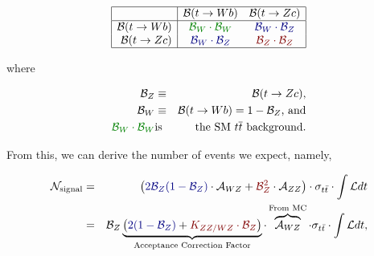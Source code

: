 \begin{displaymath}
\begin{array}{|r|cc|}
\hline
                                & {\mathcal B}(t \rightarrow Wb) &
{\mathcal B}(t \rightarrow Zc) \\
\hline
{\mathcal B}(t \rightarrow Wb) & {\color[rgb]{0, 0.5, 0}\bw \cdot \bw} &
{\color[rgb]{0, 0, 0.5}\bw \cdot \bz} \\
{\mathcal B}(t \rightarrow Zc) & {\color[rgb]{0, 0, 0.5}\bw \cdot \bz} &
{\color[rgb]{0.5, 0, 0}\bz \cdot \bz} \\
\hline
\end{array}
\end{displaymath}

where

\begin{eqnarray*}
\bz & \equiv & {\mathcal B}(t \rightarrow Zc) \textrm{,} \\
\bw & \equiv & {\mathcal B}(t \rightarrow Wb) = 1 - \bz  \textrm{, and} \\
{\color[rgb]{0, 0.5, 0}\bw \cdot \bw} & \textrm{is} & \textrm{the SM \ttbar background.}
\end{eqnarray*}

From this, we can derive the number of events we expect, namely,

\begin{eqnarray*}
{\mathcal N}_\textrm{signal} &=& \left( {\color[rgb]{0, 0, 0.5}2 \bz (1
- \bz)} \cdot {\mathcal A}_{WZ} + {\color[rgb]{0.5, 0, 0}\bz^2} \cdot
{\mathcal A}_{ZZ} \right) \cdot \sigma_{t \bar{t}} \cdot \int {\mathcal
L} dt\\
&=& \bz
           \underbrace{ \left( {\color[rgb]{0, 0, 0.5}2 (1 - \bz)} +
{\color[rgb]{0.5, 0, 0}K_{ZZ/WZ} \cdot \bz} \right)}_\textrm{Acceptance
Correction Factor} \cdot
           \overbrace{{\mathcal A}_{WZ}}^\textrm{From MC}  \cdot
\sigma_{t \bar{t}} \cdot \int {\mathcal L} dt,\\
\end{eqnarray*}

